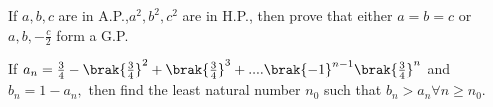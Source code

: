 		\hfill {}                             
     
	\item If $a,b,c$ are in A.P.,$a^{2},b^{2},c^{2} $ are in H.P., then prove that either $ a=b=c $ or $a,b,-\frac{c}{2}$ form a G.P. 
		                    
		\hfill {}                            

	\item If $ a_n=\frac{3}{4}-\brak{\frac{3}{4}}^{2}+\brak{\frac{3}{4}}^{3}+....\brak{-1}^{n-1}\brak{\frac{3}{4}}^{n} $ and $ b_{n}=1-a_{n}, $ then find the least natural number $n_{0}$ such that $ b_{n} > a_{n} \forall n \geq n_{0}. $ 
		             
		\hfill {}
